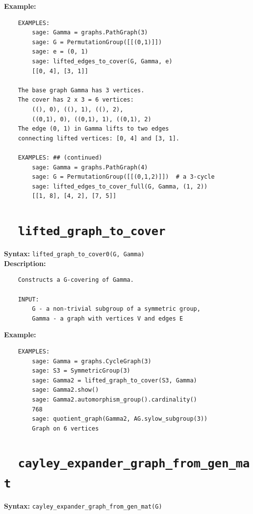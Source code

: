 \documentclass{article}
\begin{document}
\textbf{Example:}
\begin{verbatim}
    EXAMPLES:
        sage: Gamma = graphs.PathGraph(3)
        sage: G = PermutationGroup([[(0,1)]])
        sage: e = (0, 1)
        sage: lifted_edges_to_cover(G, Gamma, e)
        [[0, 4], [3, 1]]

    The base graph Gamma has 3 vertices.
    The cover has 2 x 3 = 6 vertices:
        ((), 0), ((), 1), ((), 2),
        ((0,1), 0), ((0,1), 1), ((0,1), 2)
    The edge (0, 1) in Gamma lifts to two edges
    connecting lifted vertices: [0, 4] and [3, 1].

    EXAMPLES: ## (continued)
        sage: Gamma = graphs.PathGraph(4)
        sage: G = PermutationGroup([[(0,1,2)]])  # a 3-cycle
        sage: lifted_edges_to_cover_full(G, Gamma, (1, 2))
        [[1, 8], [4, 2], [7, 5]]

\end{verbatim}

\section{\tt \ \ lifted\_graph\_to\_cover}

\textbf{Syntax:} \verb}lifted_graph_to_cover0(G, Gamma)}\\

\textbf{Description:}
\begin{verbatim}
    Constructs a G-covering of Gamma.

    INPUT:
        G - a non-trivial subgroup of a symmetric group,
        Gamma - a graph with vertices V and edges E

\end{verbatim}

\textbf{Example:}
\begin{verbatim}
    EXAMPLES:
        sage: Gamma = graphs.CycleGraph(3)
        sage: S3 = SymmetricGroup(3)
        sage: Gamma2 = lifted_graph_to_cover(S3, Gamma)
        sage: Gamma2.show()
        sage: Gamma2.automorphism_group().cardinality()
        768
        sage: quotient_graph(Gamma2, AG.sylow_subgroup(3))
        Graph on 6 vertices
\end{verbatim}


\section{\tt \ \ cayley\_expander\_graph\_from\_gen\_mat}

\textbf{Syntax:} \verb}cayley_expander_graph_from_gen_mat(G)}\\
\end{document}
